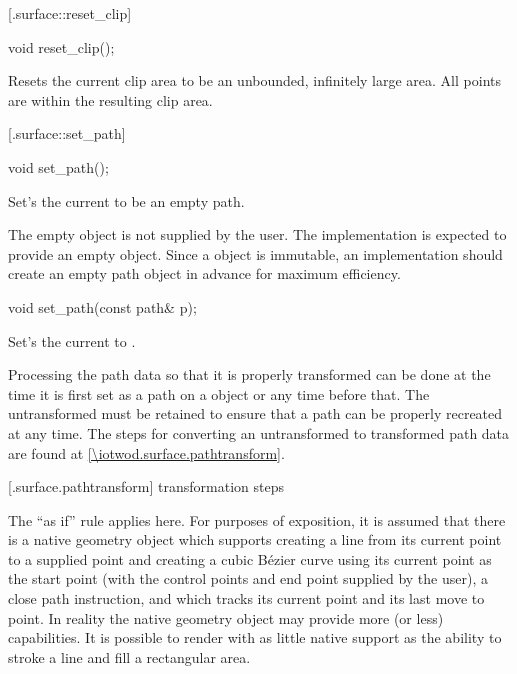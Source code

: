  [\iotwod.surface::reset_clip] {}

%
%
\begin{itemdecl}
void reset_clip();
\end{itemdecl}
\begin{itemdescr}
	\pnum
	\effects
	Resets the current clip area to be an unbounded, infinitely large area. All points are within the resulting clip area.
\end{itemdescr}

 [\iotwod.surface::set_path] {}

%
%
\begin{itemdecl}
void set_path();
\end{itemdecl}
\begin{itemdescr}
	\pnum
	\effects
	Set's the current  to be an empty path.
	
	\pnum
	\realnotes
	The empty  object is not supplied by the user. The implementation is expected to provide an empty  object. Since a  object is immutable, an implementation should create an empty path object in advance for maximum efficiency.
\end{itemdescr}
\begin{itemdecl}
void set_path(const path& p);
\end{itemdecl}
\begin{itemdescr}
	\pnum
	\effects
	Set's the current  to .
	
	\pnum
	\remarks
	Processing the path data so that it is properly transformed can be done at the time it is first set as a path on a  object or any time before that. The untransformed  must be retained to ensure that a path can be properly recreated at any time. The steps for converting an untransformed  to transformed path data are found at \ref{\iotwod.surface.pathtransform}.
\end{itemdescr}

 [\iotwod.surface.pathtransform] { transformation steps}

\pnum
	\enternote
	The ``as if'' rule applies here. For purposes of exposition, it is assumed that there is a native geometry object which supports creating a line from its current point to a supplied point and creating a cubic B\'{e}zier curve using its current point as the start point (with the control points and end point supplied by the user), a close path instruction, and which tracks its current point and its last move to point. In reality the native geometry object may provide more (or less) capabilities. It is possible to render with as little native support as the ability to stroke a line and fill a rectangular area.
	\exitnote

